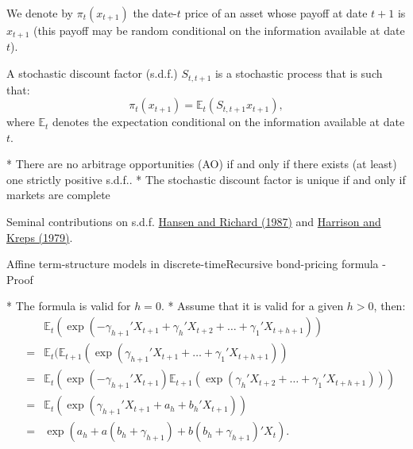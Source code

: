 {}


\begin{defn}\label{def:sdf}

We denote by $\pi_t(x_{t+1})$ the date-$t$ price of an asset whose payoff at date $t+1$ is $x_{t+1}$ (this payoff may be random conditional on the information available at date $t$).

\vspace{.2cm}

A {\color{blue} stochastic discount factor (s.d.f.)} $S_{t,t+1}$ is a stochastic process that is such that:
$$
\pi_t(x_{t+1}) = \mathbb{E}_t(S_{t,t+1}x_{t+1}),
$$
where $\mathbb{E}_t$ denotes the expectation conditional on the information available at date $t$.
\end{defn}

\begin{prop}
* There are no arbitrage opportunities (AO) if and only if there exists (at least) one strictly positive s.d.f..
* The stochastic discount factor is unique if and only if markets are complete

\end{prop}

\begin{exampleblock}{Seminal contributions on s.d.f.}
\href{http://faculty.chicagobooth.edu/john.cochrane/teaching/35904_asset_pricing/hansen\%20richard\%20econometrica.pdf}{Hansen and Richard (1987)} and \href{http://www.sciencedirect.com/science/article/pii/0022053179900437}{Harrison and Kreps (1979)}.
\end{exampleblock}





{Affine term-structure models in discrete-time}{Recursive bond-pricing formula - Proof}\label{slide:proofrecursive}
\hyperlink{slide:ATSM}{}
\begin{small}

	* The formula is valid for $h=0$.
	* Assume that it is valid for a given $h>0$, then:
	\begin{eqnarray*}
	&& \mathbb{E}_t(\exp(-\gamma_{h+1}'X_{t+1}+\gamma_h'X_{t+2} + \dots + \gamma_1'X_{t+h+1}))\\
	&=& \mathbb{E}_t(\mathbb{E}_{t+1}(\exp(\gamma_{h+1}'X_{t+1} + \dots + \gamma_{1}'X_{t+h+1})) \\
	&=& \mathbb{E}_t(\exp(-\gamma_{h+1}'X_{t+1})\mathbb{E}_{t+1}(\exp(\gamma_{h}'X_{t+2} + \dots + \gamma_{1}'X_{t+h+1}))) \\
	&=& \mathbb{E}_t(\exp(\gamma_{h+1}'X_{t+1} + a_h + b_h'X_{t+1})) \\
	&=& \exp(a_h + a(b_h+\gamma_{h+1}) +  b(b_h+\gamma_{h+1})'X_{t}).
	\end{eqnarray*}

\end{small}




